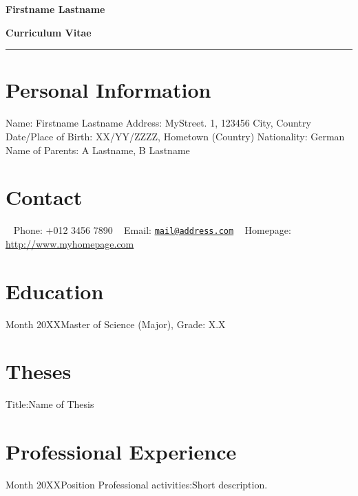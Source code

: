 \documentclass{tiny_cv}
\def\firstname{Firstname }
\def\familyname{Lastname}
\begin{document}
\begin{center}
\fontsize{30}{40}\selectfont \textbf{\firstname \familyname}
\end{center}

\begin{center}
\LARGE \textbf{Curriculum Vitae}
\end{center}


\noindent\rule{\textwidth}{1.2pt}

\section{Personal Information}
\identifyinginformationsubsection
{Name: \firstname \familyname}
{Address: MyStreet. 1, 123456 City, Country}
{Date/Place of Birth: XX/YY/ZZZZ, Hometown (Country)}
{Nationality: German}
{Name of Parents: A \familyname, B \familyname}

\section{Contact}
\contactinformationsubsection
{\Telefon~ Phone: +012 3456 7890}
{\Letter~ Email: \href{mailto:mail@address.com}{\nolinkurl{mail@address.com}}}
{\Mundus~ Homepage: \url{http://www.myhomepage.com}}

\section{Education}

                   {Month 20XX}{Master of Science (Major), Grade: X.X}

\section{Theses}
                 {Title:}{Name of Thesis}

\section{Professional Experience}

                         {Month 20XX}{Position}
                         {Professional activities:}{Short description.}
\end{document}
